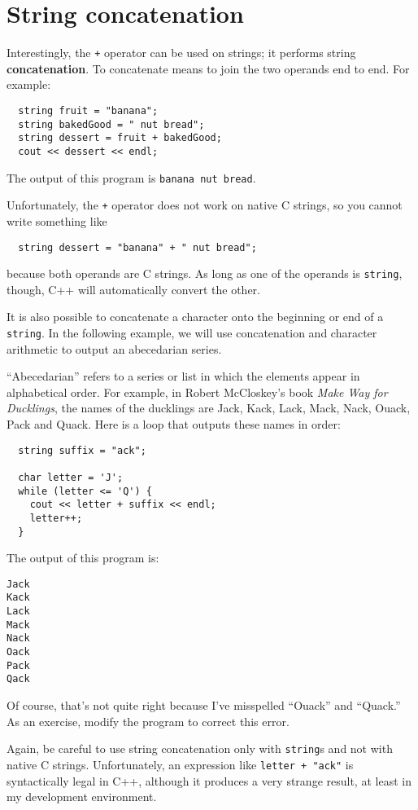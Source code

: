 \section{String concatenation}

Interestingly, the {\tt +} operator can be used on strings;
it performs string {\bf concatenation}.  To concatenate means to
join the two operands end to end.  For example:

\begin{verbatim}
  string fruit = "banana";
  string bakedGood = " nut bread";
  string dessert = fruit + bakedGood;
  cout << dessert << endl;
\end{verbatim}
%
The output of this program is {\tt banana nut bread}.

Unfortunately, the {\tt +} operator does not work on native
C strings, so you cannot write something like

\begin{verbatim}
  string dessert = "banana" + " nut bread";
\end{verbatim}
%
because both operands are C strings.  As long as one of the
operands is  {\tt string}, though, C++ will automatically
convert the other.

It is also possible to concatenate a character onto the
beginning or end of a {\tt string}.  In the following example, we
will use concatenation and character arithmetic to output
an abecedarian series.

``Abecedarian'' refers to a series or list in which the elements
appear in alphabetical order.  For example, in Robert McCloskey's book
{\em Make Way for Ducklings}, the names of the ducklings are Jack,
Kack, Lack, Mack, Nack, Ouack, Pack and Quack.  Here is a loop that
outputs these names in order:

\begin{verbatim}
  string suffix = "ack";

  char letter = 'J';
  while (letter <= 'Q') {
    cout << letter + suffix << endl;
    letter++;
  }
\end{verbatim}
%
The output of this program is:

\begin{verbatim}
Jack
Kack
Lack
Mack
Nack
Oack
Pack
Qack
\end{verbatim}
%
Of course, that's not quite right because I've misspelled ``Ouack''
and ``Quack.''  As an exercise, modify the program to correct
this error.

Again, be careful to use string concatenation only with {\tt string}s
and not with native C strings.  Unfortunately, an expression like
{\tt letter + "ack"} is syntactically legal in C++, although it
produces a very strange result, at least in my development environment.


